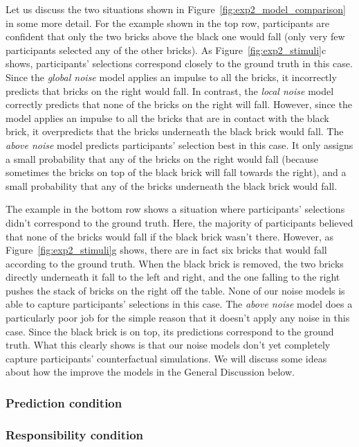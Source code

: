 \documentclass[10pt, letterpaper]{article}
\begin{document}
Let us discuss the two situations shown in Figure~\ref{fig:exp2_model_comparison} in some more detail. For the example shown in the top row, participants are confident that only the two bricks above the black one would fall (only very few participants selected any of the other bricks). As Figure~\ref{fig:exp2_stimuli}c shows, participants' selections correspond closely to the ground truth in this case. Since the \emph{global noise} model applies an impulse to all the bricks, it incorrectly predicts that bricks on the right would fall. In contrast, the \emph{local noise} model correctly predicts that none of the bricks on the right will fall. However, since the model applies an impulse to all the bricks that are in contact with the black brick, it overpredicts that the bricks underneath the black brick would fall. The \emph{above noise}  model predicts participants' selection best in this case. It only assigns a small probability that any of the bricks on the right would fall (because sometimes the bricks on top of the black brick will fall towards the right), and a small probability that any of the bricks underneath the black brick would fall. 

The example in the bottom row shows a situation where participants' selections didn't correspond to the ground truth. Here, the majority of participants believed that none of the bricks would fall if the black brick wasn't there. However, as Figure~\ref{fig:exp2_stimuli}g shows, there are in fact six bricks that would fall according to the ground truth. When the black brick is removed, the two bricks directly underneath it fall to the left and right, and the one falling to the right pushes the stack of bricks on the right off the table. None of our noise models is able to capture participants' selections in this case. The \emph{above noise} model does a particularly poor job for the simple reason that it doesn't apply any noise in this case. Since the black brick is on top, its predictions correspond to the ground truth. What this clearly shows is that our noise models don't yet completely capture participants' counterfactual simulations. We will discuss some ideas about how the improve the models in the General Discussion below. 


\subsubsection{Prediction condition}
\label{ssub:prediction_condition}


\subsubsection{Responsibility condition}
\label{ssub:responsibility_condition}
\end{document}
